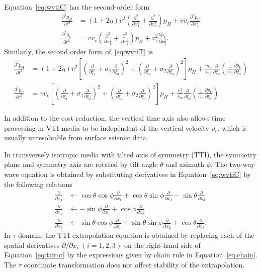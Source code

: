 Equation~\ref{eq:wvtiC} has the second-order form
\begin{align}\label{eq:wvtiC2}
\frac{\partial^2 p_H}{\partial t^2} & = (1+2\eta)v^2 \left(\frac{\partial^2}{\partial x_1^2} + \frac{\partial^2}{\partial x_2^2}\right) p_H + v v_v\frac{\partial^2 p_V}{\partial x_3^2} \nonumber \\
\frac{\partial^2 p_V}{\partial t^2} & = v v_v \left(\frac{\partial^2}{\partial x_1^2} + \frac{\partial^2}{\partial x_2^2}\right) p_H + v_v^2 \frac{\partial p_V}{\partial x_3^2} .
\end{align}
Similarly, the second order form of~\ref{eq:wvtiT} is
\begin{align}\label{eq:wvtiT2}
\frac{\partial^2 p_H}{\partial t^2} & = (1+2\eta)v^2 \left[ \left(\frac{\partial}{\partial \xi_1} + \sigma_1\frac{\partial}{\partial \xi_3}\right)^2 + \left(\frac{\partial}{\partial \xi_2} + \sigma_2\frac{\partial}{\partial \xi_3}\right)^2 \right] p_H + \frac{v v_v}{v_m} \frac{\partial}{\partial \xi_3} \left(\frac{1}{v_m} \frac{\partial p_V}{\partial \xi_3} \right) \nonumber \\
\frac{\partial^2 p_V}{\partial t^2} & = v v_v \left[ \left(\frac{\partial}{\partial \xi_1} + \sigma_1\frac{\partial}{\partial \xi_3}\right)^2 + \left(\frac{\partial}{\partial \xi_2} + \sigma_2\frac{\partial}{\partial \xi_3}\right)^2 \right] p_H + \frac{v_v^2}{v_m} \frac{\partial}{\partial \xi_3} \left(\frac{1}{v_m} \frac{\partial p_V}{\partial \xi_3} \right)
\end{align}

In addition to the cost reduction, the vertical time axis also allows time processing in VTI media to be independent of the vertical velocity $v_v$, which is usually unresolvable from surface seismic data. 

In transversely isotropic media with tilted axis of symmetry (TTI), the symmetry plane and symmetry axis are rotated by tilt angle $\theta$ and azimuth $\phi$. The two-way wave equation is obtained by substituting derivatives in Equation~\ref{eq:wvtiC} by the following relations 
\begin{align}\label{eq:ttirot}
\frac{\partial}{\partial x_1} & \leftarrow \cos\theta\cos\phi \frac{\partial}{\partial x_1} + \cos\theta\sin\phi \frac{\partial}{\partial x_2} - \sin\theta \frac{\partial}{\partial x_3} \nonumber \\
\frac{\partial}{\partial x_2} & \leftarrow -\sin\phi \frac{\partial}{\partial x_1} + \cos\phi \frac{\partial}{\partial x_2}  \\
\frac{\partial}{\partial x_3} & \leftarrow \sin\theta\cos\phi \frac{\partial}{\partial x_1} + \sin\theta\sin\phi \frac{\partial}{\partial x_2} + \cos\theta \frac{\partial}{\partial x_3} \nonumber .
\end{align}
In $\tau$ domain, the TTI extrapolation equation is obtained by replacing each of the spatial derivatives $\partial / \partial x_i \; (i=1,2,3)$ on the right-hand side of Equation~\ref{eq:ttirot} by the expressions given by chain rule in Equation~\ref{eq:chain}. The $\tau$ coordinate transformation does not affect stability of the extrapolation.

